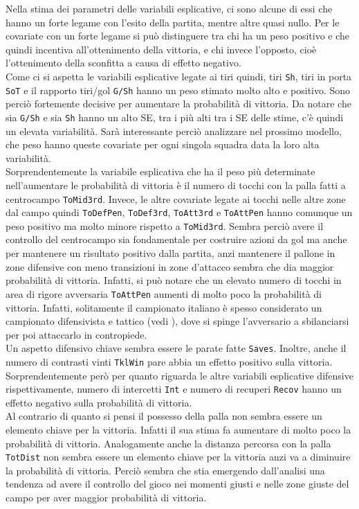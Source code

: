 Nella stima dei parametri delle variabili esplicative, ci sono alcune di essi che hanno un forte legame con l'esito della partita, mentre altre quasi nullo. Per le covariate con un forte legame si può distinguere tra chi ha un peso positivo e che quindi incentiva all'ottenimento della vittoria, e chi invece l'opposto, cioè l'ottenimento della sconfitta a causa di effetto negativo.\\
Come ci si aspetta le variabili esplicative legate ai tiri quindi, tiri \texttt{Sh}, tiri in porta \texttt{SoT} e il rapporto tiri/gol \texttt{G/Sh} hanno un peso stimato molto alto e positivo. Sono perciò fortemente decisive per aumentare la probabilità di vittoria. Da notare che sia \texttt{G/Sh} e sia \texttt{Sh} hanno un alto SE, tra i più alti tra i SE delle stime, c'è quindi un elevata variabilità. Sarà interessante perciò analizzare nel prossimo modello, che peso hanno queste covariate per ogni singola squadra data la loro alta variabilità.\\
Sorprendentemente la variabile esplicativa che ha il peso più determinate nell'aumentare le probabilità di vittoria è il numero di tocchi con la palla fatti a centrocampo \texttt{ToMid3rd}. Invece, le altre covariate legate ai tocchi nelle altre zone dal campo quindi \texttt{ToDefPen}, \texttt{ToDef3rd}, \texttt{ToAtt3rd} e \texttt{ToAttPen} hanno comunque un peso positivo ma molto minore rispetto a \texttt{ToMid3rd}. Sembra perciò avere il controllo del centrocampo sia fondamentale per costruire azioni da gol ma anche per mantenere un risultato positivo dalla partita, anzi mantenere il pallone in zone difensive con meno transizioni in zone d'attacco sembra che dia maggior probabilità di vittoria. Infatti, si può notare che un elevato numero di tocchi in area di rigore avversaria \texttt{ToAttPen} aumenti di molto poco la probabilità di vittoria. Infatti, solitamente il campionato italiano è spesso considerato un campionato difensivista e tattico (vedi \textit{\cite{speculazione}}), dove si spinge l'avversario a sbilanciarsi per poi attaccarlo in contropiede.\\
Un aspetto difensivo chiave sembra essere le parate fatte \texttt{Saves}. Inoltre, anche il numero di contrasti vinti \texttt{TklWin} pare abbia un effetto positivo sulla vittoria. Sorprendentemente però per quanto riguarda le altre variabili esplicative difensive rispettivamente, numero di intercetti \texttt{Int} e numero di recuperi \texttt{Recov} hanno un effetto negativo sulla probabilità di vittoria. \\
Al contrario di quanto si pensi il possesso della palla non sembra essere un elemento chiave per la vittoria. Infatti il sua stima fa aumentare di molto poco la probabilità di vittoria. Analogamente anche la distanza percorsa con la palla \texttt{TotDist} non sembra essere un elemento chiave per la vittoria anzi va a diminuire la probabilità di vittoria. Perciò sembra che stia emergendo dall'analisi una tendenza ad avere il controllo del gioco nei momenti giusti e nelle zone giuste del campo per aver maggior probabilità di vittoria.\\
